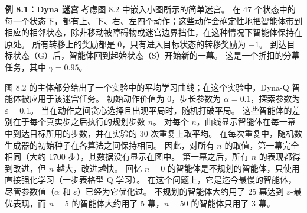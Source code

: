 \documentclass[UTF8,12pt,a4paper,fontset=fandol]{ctexart}
\begin{document}
\begin{center}
\end{center}

\noindent\textbf{例 8.1：Dyna 迷宫}
考虑图 8.2 中嵌入小图所示的简单迷宫。
在 47 个状态中的每一个状态下，都有上、下、右、左四个动作；这些动作会确定性地把智能体带到相应的相邻状态，除非移动被障碍物或迷宫边界挡住，在这种情况下智能体保持在原处。
所有转移上的奖励都是 0，只有进入目标状态的转移奖励为 $+1$。
到达目标状态（G）后，智能体回到起始状态（S）开始新的一幕。
这是一个折扣的分幕任务，其中 $\gamma=0.95$。

图 8.2 的主体部分给出了一个实验中的平均学习曲线；在这个实验中，Dyna-Q 智能体被应用于该迷宫任务。
初始动作价值为 0，步长参数为 $\alpha=0.1$，探索参数为 $\varepsilon=0.1$。
当在动作之间贪心选择且出现平局时，随机打破平局。
这些智能体的差别在于每个真实步之后执行的规划步数 $n$。
对每个 $n$，曲线显示智能体在每一幕中到达目标所用的步数，并在实验的 30 次重复上取平均。
在每次重复中，随机数生成器的初始种子在各算法之间保持相同。
因此，对所有 $n$ 的取值，第一幕完全相同（大约 1700 步），其数据没有显示在图中。
第一幕之后，所有 $n$ 的表现都得到改进，但 $n$ 越大，改进越快。
回忆 $n=0$ 的智能体是不规划的智能体，只使用直接强化学习（一步表格型 Q 学习）。
在这个问题上，它是迄今最慢的智能体，尽管参数值（$\alpha$ 和 $\varepsilon$）已经为它优化过。
不规划的智能体大约用了 25 幕达到 $\varepsilon$-最优表现，而 $n=5$ 的智能体大约用了 5 幕，$n=50$ 的智能体只用了 3 幕。
\end{document}
